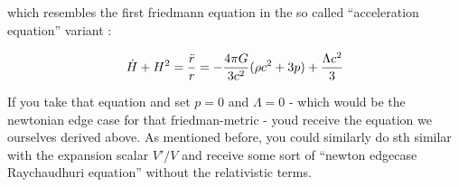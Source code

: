 \documentclass{article}
\begin{document}
which resembles the first friedmann equation in the so called ``acceleration equation'' variant :

$$\dot{H} + H^2  = \frac{\ddot{r}}{r}= -\frac{4 \pi G}{3 c^2}(\rho c^2 + 3p) + \frac{\Lambda c^2}{3}\\ $$

If you take that equation and set $p=0$ and $\Lambda = 0$ - which would be the newtonian edge case for that friedman-metric - youd receive the equation we ourselves derived above. As mentioned before, you could similarly do sth similar with the expansion scalar $V'/V$ and receive some sort of ``newton edgecase Raychaudhuri equation'' without the relativistic terms.
\end{document}

